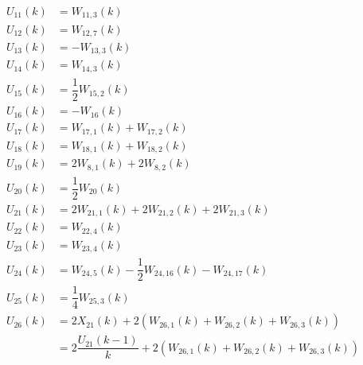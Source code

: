 \begin{align} \label{eq:allRecRel2}
\begin{split}
U_{11} \left(k\right)&= W_{11,3}\left(k\right)\\
U_{12} \left(k\right)&= W_{12,7}\left(k\right)\\
U_{13} \left(k\right)&= -W_{13,3}\left(k\right)\\
U_{14} \left(k\right)&= W_{14,3}\left(k\right)\\
U_{15} \left(k\right)&= \dfrac{1}{2}W_{15,2}\left(k\right)\\
U_{16} \left(k\right)&= -W_{16}\left(k\right)\\
U_{17} \left(k\right)&= W_{17,1}\left(k\right)+W_{17,2}\left(k\right)\\
U_{18} \left(k\right)&= W_{18,1}\left(k\right)+W_{18,2}\left(k\right)\\
U_{19} \left(k\right)&= 2W_{8,1}\left(k\right)+2W_{8,2}\left(k\right)\\
U_{20} \left(k\right)&= \dfrac{1}{2}W_{20}\left(k\right)\\
U_{21} \left(k\right)&= 2W_{21,1}\left(k\right)+2W_{21,2}\left(k\right)+2W_{21,3}\left(k\right)\\
U_{22} \left(k\right)&= W_{22,4}\left(k\right)\\
U_{23} \left(k\right)&= W_{23,4}\left(k\right)\\
U_{24} \left(k\right)&=  W_{24,5}\left(k\right)-\dfrac{1}{2}W_{24,16}\left(k\right)-W_{24,17}\left(k\right)\\
U_{25} \left(k\right)&=  \dfrac{1}{4}W_{25,3}\left(k\right)\\
U_{26} \left(k\right)&=  2X_{21}\left(k\right)+2\left(W_{26,1}\left(k\right)+W_{26,2}\left(k\right)+W_{26,3}\left(k\right)\right)\\
&=2\dfrac{U_{21}\left(k-1\right)}{k}+2\left(W_{26,1}\left(k\right)+W_{26,2}\left(k\right)+W_{26,3}\left(k\right)\right)\\
\end{split}
\end{align}

